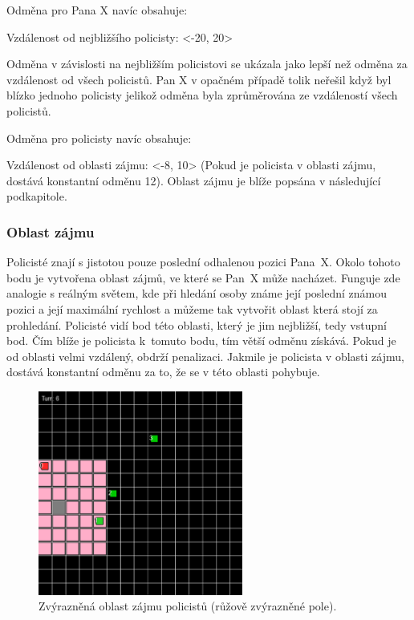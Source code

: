 \bigskip

Odměna pro Pana X navíc obsahuje:
\begin{myitemize}
  \item Vzdálenost od nejbližšího policisty: <-20, 20>
  \begin{myitemize}
    \item Odměna v závislosti na nejbližším policistovi se ukázala jako lepší než odměna za vzdálenost od všech policistů.
    Pan X v opačném případě tolik neřešil když byl blízko jednoho policisty jelikož odměna byla zprůměrována ze vzdáleností všech policistů.
  \end{myitemize}
\end{myitemize}

Odměna pro policisty navíc obsahuje:
\begin{myitemize}
  \item Vzdálenost od oblasti zájmu: <-8, 10> (Pokud je policista v oblasti zájmu, dostává konstantní odměnu 12).
  Oblast zájmu je blíže popsána v následující podkapitole.
\end{myitemize}

\subsubsection{Oblast zájmu}
\label{subsubsec:oblast_zajmu}

Policisté znají s jistotou pouze poslední odhalenou pozici Pana~X\@.
Okolo tohoto bodu je vytvořena oblast zájmů, ve které se Pan~X může nacházet.
Funguje zde analogie s reálným světem, kde při hledání osoby známe její poslední známou pozici a její maximální rychlost a můžeme tak vytvořit oblast která stojí za prohledání.
Policisté vidí bod této oblasti, který je jim nejbližší, tedy vstupní bod.
Čím blíže je policista k~tomuto bodu, tím větší odměnu získává.
Pokud je od oblasti velmi vzdálený, obdrží penalizaci.
Jakmile je policista v oblasti zájmu, dostává konstantní odměnu za to, že se v této oblasti pohybuje.

\begin{figure}[H]
	\centering
	\includegraphics[width=0.6\textwidth]{obrazky-figures/interest_area}
      \caption{Zvýrazněná oblast zájmu policistů (růžově zvýrazněné pole).}
    \label{fig:game_11}
\end{figure}

